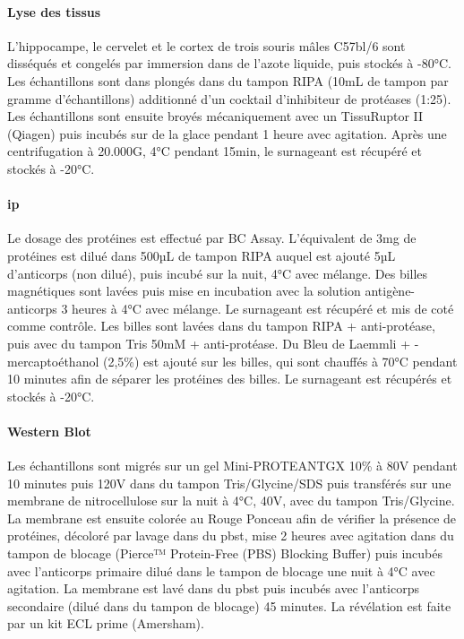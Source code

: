 	\paragraph{Lyse des tissus}
	\label{par:lyse}
	L'hippocampe, le cervelet et le cortex de trois souris mâles C57bl/6 sont disséqués et congelés par immersion dans de l'azote liquide, puis stockés à -80°C. Les échantillons sont dans plongés dans du tampon RIPA (10mL de tampon par gramme d'échantillons) additionné d'un cocktail d'inhibiteur de protéases (1:25). Les échantillons sont ensuite broyés mécaniquement avec un TissuRuptor II (Qiagen\textregistered) puis incubés sur de la glace pendant 1 heure avec agitation. Après une centrifugation à 20.000G, 4°C pendant 15min, le surnageant est récupéré et stockés à -20°C. 
	
	\paragraph{\Acrlong{ip}}
	\label{par:ip}
	Le dosage des protéines est effectué par BC Assay. L'équivalent de 3mg de protéines est dilué dans 500µL de tampon RIPA auquel est ajouté 5µL d'anticorps (non dilué), puis incubé sur la nuit, 4°C avec mélange. Des billes magnétiques sont lavées puis mise en incubation avec la solution antigène-anticorps 3 heures à 4°C avec mélange. Le surnageant est récupéré et mis de coté comme contrôle. Les billes sont lavées dans du tampon RIPA + anti-protéase, puis avec du tampon Tris 50mM + anti-protéase. Du Bleu de Laemmli + \textbeta-mercaptoéthanol (2,5\%) est ajouté sur les billes, qui sont chauffés à 70°C pendant 10 minutes afin de séparer les protéines des billes. Le surnageant est récupérés et stockés à -20°C. 
	
	\paragraph{Western Blot}
	\label{par:wb}
	Les échantillons sont migrés sur un gel Mini-PROTEAN\textregistered TGX 10\% à 80V pendant 10 minutes puis 120V dans du tampon Tris/Glycine/SDS puis transférés sur une membrane de nitrocellulose sur la nuit à 4°C, 40V, avec du tampon Tris/Glycine. La membrane est ensuite colorée au Rouge Ponceau afin de vérifier la présence de protéines, décoloré par lavage dans du \acrshort{pbst}, mise 2 heures avec agitation dans du tampon de blocage (Pierce™ Protein-Free (PBS) Blocking Buffer) puis incubés avec l'anticorps primaire dilué dans le tampon de blocage une nuit à 4°C avec agitation. La membrane est lavé dans du \acrshort{pbst} puis incubés avec l'anticorps secondaire (dilué dans du tampon de blocage) 45 minutes. La révélation est faite par un kit ECL prime (Amersham\textregistered).
		
